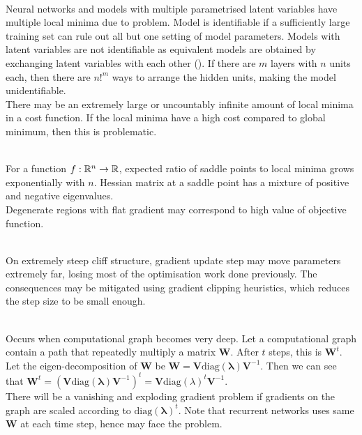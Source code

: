 \begin{remark} \\
Neural networks and models with multiple parametrised latent variables have multiple local minima due to  problem. Model is identifiable if a sufficiently large training set can rule out all but one setting of model parameters. Models with latent variables are not identifiable as equivalent models are obtained by exchanging latent variables with each other (). If there are $m$ layers with $n$ units each, then there are $n!^m$ ways to arrange the hidden units, making the model unidentifiable.\\
There may be an extremely large or uncountably infinite amount of local minima in a cost function. If the local minima have a high cost compared to global minimum, then this is problematic.
\end{remark}

\begin{remark} \\
For a function $f: \mathbb{R}^n \rightarrow \mathbb{R}$, expected ratio of saddle points to local minima grows exponentially with $n$. Hessian matrix at a saddle point has a mixture of positive and negative eigenvalues.\\
Degenerate regions with flat gradient may correspond to high value of objective function.
\end{remark}

\begin{remark} \\
On extremely steep cliff structure, gradient update step may move parameters extremely far, losing most of the optimisation work done previously. The consequences may be mitigated using gradient clipping heuristics, which reduces the step size to be small enough.
\end{remark}

\begin{remark} \\
Occurs when computational graph becomes very deep. Let a computational graph contain a path that repeatedly multiply a matrix $\bm{W}$. After $t$ steps, this is $\bm{W}^t$. Let the eigen-decomposition of $\bm{W}$ be $\bm{W} = \bm{V} \text{diag}(\bm{\lambda}) \bm{V}^{-1}$. Then we can see that $\bm{W}^t = (\bm{V} \text{diag}(\bm{\lambda}) \bm{V}^{-1})^t = \bm{V} \text{diag}(\lambda)^t \bm{V}^{-1}$.\\
There will be a vanishing and exploding gradient problem if gradients on the graph are scaled according to $\text{diag}(\bm{\lambda})^t$.  Note that recurrent networks uses same $\bm{W}$ at each time step, hence may face the problem.
\end{remark}

